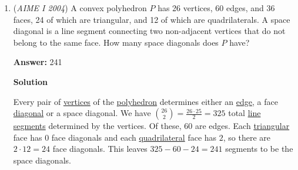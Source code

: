 \begin{enumerate}
 It is given $\mathcal{A}$ has $m$ members, and each member is represented as the sequence $\{p, p+1, p+2, \dots , p+m-1 \}$. It is given that $\mathcal{B}$ has $2m$ members, and each member is represented as the sequence $\{q, q+1, q+2, \dots, q+2m-1\}$.

 Now note that $\sum \mathcal{A} = 2m$ and $\sum \mathcal{B} = m$. It is seen that each of $\mathcal{A}$, $\mathcal{B}$ is an \textbf{arithmetic sequence}, and thus the sum $\mathcal{S}$ can be determined as

 
 \[\frac{2p+m-1}{2} \cdot m = 2m \implies 2p+m = 5\]
 \[\frac{2q+2m-1}{2} \cdot 2m = m \implies q+m = 1\]

 From the third statement, $|p - q - m| = 99$. Definition of absolute value is that $p-q-m = 99$ or $p-q-m = -99$.

 Applying the first equation gives $n = 100$ making $m$ negative, which is not allowed as counts cannot be negative. Otherwise, $n = -98$ and then $m = \boxed{201}$, a valid and satisfactory result.

 


	\item (\textit{AIME I 2004}) A convex polyhedron $P$ has 26 vertices, 60 edges, and 36 faces, 24 of which are triangular, and 12 of which are quadrilaterals. A space diagonal is a line segment connecting two non-adjacent vertices that do not belong to the same face. How many space diagonals does $P$ have?


 
 \textbf{Answer: }241



\textbf{Solution}

Every pair of \href{https://artofproblemsolving.com/wiki/index.php?title=Vertex}{ vertices} of the \href{https://artofproblemsolving.com/wiki/index.php?title=Polyhedron}{polyhedron} determines either an \href{https://artofproblemsolving.com/wiki/index.php?title=Edge}{edge}, a face \href{https://artofproblemsolving.com/wiki/index.php?title=Diagonal}{diagonal} or a space diagonal.  We have ${26 \choose 2} = \frac{26\cdot25}2 = 325$ total \href{https://artofproblemsolving.com/wiki/index.php?title=Line\_segment}{line segments} determined by the vertices.  Of these, $60$ are edges.  Each \href{https://artofproblemsolving.com/wiki/index.php?title=Triangle}{triangular} face has $0$ face diagonals and each \href{https://artofproblemsolving.com/wiki/index.php?title=Quadrilateral}{quadrilateral} face has $2$, so there are $2 \cdot 12 = 24$ face diagonals.  This leaves $325 - 60 - 24 = \boxed{241}$ segments to be the space diagonals.


\end{enumerate}

